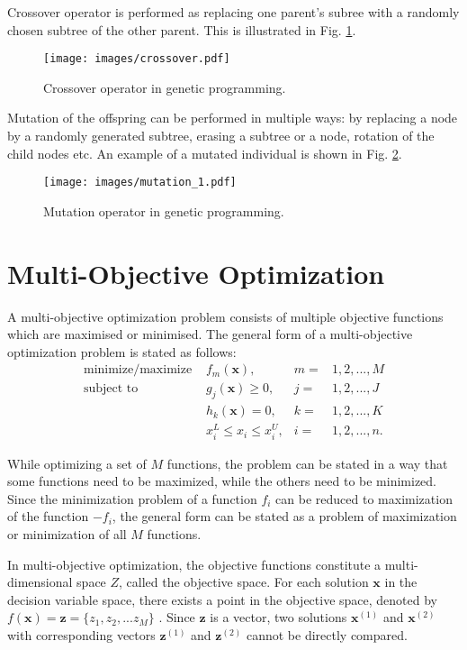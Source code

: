 Crossover operator is performed as replacing one parent's subree with a randomly chosen subtree of the other parent.
This is illustrated in Fig. \ref{genprog:ex2}.
\begin{figure}[ht]
    \centering
    \texttt{[image: images/crossover.pdf]}
    \caption{Crossover operator in genetic programming.}
    \label{genprog:ex2}
\end{figure}

Mutation of the offspring can be performed in multiple ways: by replacing a node by a randomly generated subtree, erasing a subtree or a node, rotation of the child nodes etc.
An example of a mutated individual is shown in Fig. \ref{genprog:ex3}.
\begin{figure}[H]
    \centering
    \texttt{[image: images/mutation\_1.pdf]}
    \caption{Mutation operator in genetic programming.}
    \label{genprog:ex3}
\end{figure}

\newpage
\section{Multi-Objective Optimization}
A multi-objective optimization problem consists of multiple objective functions which are maximised or minimised. 
The general form of a multi-objective optimization problem is stated as follows:
\begin{align*}
\text{minimize/maximize } & f_m(\textbf{x}),  & m = & 1, 2, ..., M \\
\text{subject to } & g_j(\textbf{x}) \geq 0, & j = & 1, 2, ..., J \\
           & h_k(\textbf{x}) = 0, & k = & 1, 2, ..., K \\
           & x_{i}^{L} \leq x_i \leq x_{i}^{U}, & i = & 1, 2, ..., n. 
\end{align*}

While optimizing a set of $M$ functions, the problem can be stated in a way that some functions need to be maximized, while the others need to be minimized. 
Since the minimization problem of a function $f_i$ can be reduced to maximization of the function $-f_i$, the general form can be stated as a problem of maximization or minimization of all $M$ functions.

In multi-objective optimization, the objective functions constitute a multi-dimensional space $Z$, called the objective space. 
For each solution $\textbf{x}$ in the decision variable space, there exists a point in the objective space, denoted by $f(\textbf{x}) = \textbf{z} = \{z_1, z_2, ... z_M\}$ 
\cite{deb2001multi}. 
Since $\textbf{z}$ is a vector, two solutions 
$\textbf{x}^{(1)}$ and $\textbf{x}^{(2)}$ with corresponding vectors $\textbf{z}^{(1)}$ and $\textbf{z}^{(2)}$ cannot be directly compared. 

